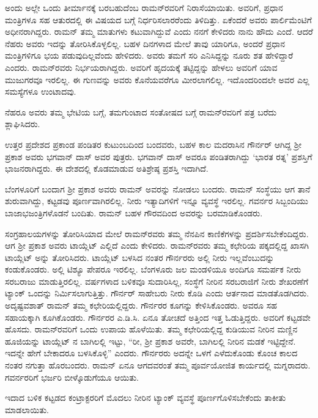 ಅಂದು ಅಲ್ಲೇ ಒಂದು ತೀರ್ಮಾನಕ್ಕೆ ಬರಬಹುದೆಂಬ ರಾಮನ್‍ರವರಿಗೆ ನಿರಾಸೆಯಾಯಿತು. ಅವರಿಗೆ, ಪ್ರಧಾನ ಮಂತ್ರಿಗಳೂ ಸಹ ಆತುರದಲ್ಲಿ ಈ ವಿಷಯದ ಬಗ್ಗೆ ನಿರ್ಧರಿಸಲಾರರೆಂದು ತಿಳಿದಿತ್ತು. ಏಕೆಂದರೆ ಅವರು ಪಾರ್ಲಿಮೆಂಟಿಗೆ ಅಧೀನರಾಗಿದ್ದರು. ರಾಮನ್ ತಮ್ಮ ಮಾತುಗಳು ಕಟುವಾಗಿದ್ದುವೆ ಎಂದು ನನಗೆ ಕೇಳಿದರು ನಾನು ಹೌದು ಎಂದೆ. ಆದರೆ ನೆಹರು ಅವರು ಇದನ್ನು ತೋರಿಸಿಕೊಳ್ಳಲಿಲ್ಲ. ಬಹಳ ದಿನಗಳಾದ ಮೇಲೆ ತಾವು ಯಾರಿಗೂ, ಅಂದರೆ ಪ್ರಧಾನ ಮಂತ್ರಿಗಳಿಗೂ ಭಯ ಪಡುವುದಿಲ್ಲವೆಂದು ಹೇಳಿದರು. ಅವರು ತಮಗೆ ಸರಿ ಎನಿಸಿದ್ದನ್ನು ನೂರು ಶತ ಹೇಳಿದ್ದಾರೆ ಎಂದರು. ರಾಮನ್‍ರವರು ನಿರ್ಭಯರಾಗಿದ್ದರು. ಅವರಿಗೆ ಹೃದಯಕ್ಕೆ ತಟ್ಟಿದ್ದನ್ನು ಹೇಳಲು ಅವರಿಗೆ ಯಾವ ಮುಜುಗರವೂ ಇರಲಿಲ್ಲ. ಈ ಗುಣವನ್ನು ಅವರು ಕೊನೆಯವರೆಗೂ ಮೀರಲಾಗಲಿಲ್ಲ. ಇದೊಂದರಿಂದಲೇ ಅವರ ಎಲ್ಲ ಸಮಸ್ಯೆಗಳೂ ಉಂಟಾದವು.

ನೆಹರೂ ಅವರು ತಮ್ಮ ಭೇಟಿಯ ಬಗ್ಗೆ, ತಮಗುಂಟಾದ ಸಂತೋಷದ ಬಗ್ಗೆ ರಾಮನ್‍ರವರಿಗೆ ಪತ್ರ ಬರೆದು ಶ್ಲಾಘಿಸಿದರು.



ಉತ್ತರ ಪ್ರದೇಶದ ಪ್ರಕಾಂಡ ಪಂಡಿತರ ಕುಟುಂಬದಿಂದ ಬಂದವರು, ಬಹಳ ಕಾಲ ಮದರಾಸಿನ ಗೌರ್ನರ್ ಆಗಿದ್ದ ಶ‍್ರೀ ಪ್ರಕಾಶ ಅವರು ಭಗವಾನ್ ದಾಸ್ ಅವರ ಪುತ್ರರು. ಭಗವಾನ್ ದಾಸ್ ಅವರೂ ಪಂಡಿತರಾಗಿದ್ದು ‘ಭಾರತ ರತ್ನ’ ಪ್ರಶಸ್ತಿಗೆ ಭಾಜನರಾಗಿದ್ದರು. ಈ ದೇಶದಲ್ಲಿ ಕೊಡಮಾಡುವ ಅತಿಶ್ರೇಷ್ಠ ಪ್ರಶಸ್ತಿ ಇದಾಗಿದೆ.

ಬೆಂಗಳೂರಿಗೆ ಬಂದಾಗ ಶ‍್ರೀ ಪ್ರಕಾಶ ಅವರು ರಾಮನ್ ಅವರನ್ನು ನೋಡಲು ಬಂದರು. ರಾಮನ್ ಸಂಸ್ಥೆಯು ಆಗ ತಾನೆ ಶುರುವಾಗಿದ್ದು, ಕಟ್ಟಡವು ಪೂರ್ಣವಾಗಿರಲಿಲ್ಲ. ನೀರು ಇತ್ಯಾದಿಗಳಿಗೆ ಇನ್ನೂ ವ್ಯವಸ್ಥೆ ಇರಲಿಲ್ಲ. ಗವರ್ನರ ಸಿಬ್ಬಂದಿಯು ಬಾಜಾಭಜಂತ್ರಿಗಳೊಡನೆ ಬಂದಿತು. ರಾಮನ್ ಬಹಳ ಗೌರವದಿಂದ ಅವರನ್ನು ಬರಮಾಡಿಕೊಂಡರು.

ಸಂಗ್ರಹಾಲಯಗಳನ್ನು ತೋರಿಸಿಯಾದ ಮೇಲೆ ರಾಮನ್‍ರವರು ತಮ್ಮ ನೆನಪಿನ ಕಾಣಿಕೆಗಳನ್ನು ಪ್ರದರ್ಶಿಸಬೇಕೆಂದಿದ್ದರು. ಆಗ ಶ‍್ರೀ ಪ್ರಕಾಶ ಅವರು ಟಾಯ್ಲೆಟ್ ಎಲ್ಲಿದೆ ಎಂದು ಕೇಳಿದರು. ರಾಮನ್‍ರವರು ತಮ್ಮ ಕಛೇರಿಯ ಪಕ್ಕದಲ್ಲಿದ್ದ ಖಾಸಗಿ ಟಾಯ್ಲೆಟ್ ಅನ್ನು ತೋರಿಸಿದರು. ಟಾಯ್ಲೆಟ್ ಬಳಸಿದ ನಂತರ ಗೌರ್ನರರು ಅಲ್ಲಿ ನೀರು ಇಲ್ಲವೆಂಬುದನ್ನು ಕಂಡುಕೊಂಡರು. ಅಲ್ಲಿ ಟಿಶ್ಯೂ ಪೇಪರೂ ಇರಲಿಲ್ಲ. ಬೆಂಗಳೂರು ಜಲ ಮಂಡಳಿಯೂ ಅಂದಿಗೂ ಸಮರ್ಪಕ ನೀರು ಸರಬರಾಜು ಮಾಡುತ್ತಿರಲಿಲ್ಲ.  ವರ್ಷಗಳಾದ ಬಳಿಕವೂ ಸುದಾರಿಸಿಲ್ಲ, ಸಂಸ್ಥೆಗೆ ನೀರಿನ ಸರಬರಾಜಿಗೆ ನೀರು ಶೇಖರಣೆಗೆ ಟ್ಯಾಂಕ್ ಒಂದನ್ನು ನಿರ್ಮಿಸಲಾಗುತ್ತಿತ್ತು. ಗೌರ್ನರ್ ಸಾಹೇಬರು ನೀರು ಕೊಡಿ ಎಂದು ಆರ್ತನಾದ ಮಾಡತೊಡಗಿದರು. ಅದೃಷ್ಟವಶಾತ್ ರಾಮನ್ ತಮ್ಮ ಕಛೇರಿಯಲ್ಲಿದ್ದರು. ಗೌರ್ನರರ ಕೂಗನ್ನು ಕೇಳಿಸಿಕೊಂಡರು. ಅವರೂ ಸಹ ಸಹಾಯಕ್ಕಾಗಿ ಕೂಗಿಕೊಂಡರು. ಗೌರ್ನರರ ಎ.ಡಿ.ಸಿ. ಏನೂ ತೋಚದೆ ಅತ್ತಿಂದ ಇತ್ತ ಓಡುತ್ತಿದ್ದರು. ಅವರಿಗೆ ಕಟ್ಟಡವೇ ಹೊಸದು. ರಾಮನ್‍ರವರಿಗೆ ಒಂದು ಉಪಾಯ ಹೊಳೆಯಿತು. ತಮ್ಮ ಕಛೇರಿಯಲ್ಲಿದ್ದ ಕುಡಿಯುವ ನೀರಿನ ಮಣ್ಣಿನ ಹೂಜಿಯನ್ನು ಟಾಯ್ಲೆಟ್ ನ ಬಾಗಿಲಲ್ಲಿ ಇಟ್ಟು, “ರೀ, ಶ‍್ರೀ ಪ್ರಕಾಶ ಅವರೇ, ಬಾಗಿಲಲ್ಲಿ ನೀರಿನ ಮಡಕೆ ಇಟ್ಟಿದ್ದೇನೆ. ಇದನ್ನೇ ಹೇಗೆ ಬೇಕಾದರೂ ಬಳಸಿಕೊಳ್ಳಿ” ಎಂದರು. ಗೌರ್ನರರು ಅದನ್ನೇ ಒಳಗೆ ಎಳೆದುಕೊಂಡು ಕೊಂಚ ಕಾಲದ ನಂತರ ನಗುತ್ತಾ ಹೊರಬಂದರು. ರಾಮನ್ ಏನೂ ಆಗದವರಂತೆ ತಮ್ಮ ಪೂರ್ವಯೋಜಿತ ಕಾರ್ಯದಲ್ಲಿ ಮಗ್ನರಾದರು. ಗವರ್ನರರಿಗೆ ಭರ್ಜರಿ ಬೀಳ್ಕೊಡುಗೆಯೂ ಆಯಿತು.

ಇದಾದ ಬಳಿಕ ಕಟ್ಟಡದ ಕಂಟ್ರಾಕ್ಟರರಿಗೆ ಮೊದಲು ನೀರಿನ ಟ್ಯಾಂಕ್ ವ್ಯವಸ್ಥೆ ಪೂರ್ಣಗೊಳಿಸಬೇಕೆಂದು ತಾಕೀತು ಮಾಡಲಾಯಿತು.



